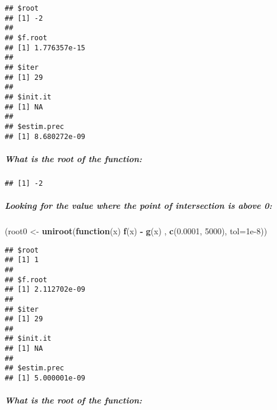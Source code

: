 \documentclass[]{article}
\newenvironment{Shaded}{\begin{snugshade}}{\end{snugshade}}
\newcommand{\ControlFlowTok}[1]{\textcolor[rgb]{0.13,0.29,0.53}{\textbf{#1}}}
\newcommand{\DataTypeTok}[1]{\textcolor[rgb]{0.13,0.29,0.53}{#1}}
\newcommand{\DecValTok}[1]{\textcolor[rgb]{0.00,0.00,0.81}{#1}}
\newcommand{\FloatTok}[1]{\textcolor[rgb]{0.00,0.00,0.81}{#1}}
\newcommand{\KeywordTok}[1]{\textcolor[rgb]{0.13,0.29,0.53}{\textbf{#1}}}
\newcommand{\NormalTok}[1]{#1}
\newcommand{\OperatorTok}[1]{\textcolor[rgb]{0.81,0.36,0.00}{\textbf{#1}}}
\newcommand{\StringTok}[1]{\textcolor[rgb]{0.31,0.60,0.02}{#1}}
\let\oldsubparagraph\subparagraph
\renewcommand{\subparagraph}[1]{\oldsubparagraph{#1}\mbox{}}
\begin{document}
\begin{verbatim}
## $root
## [1] -2
## 
## $f.root
## [1] 1.776357e-15
## 
## $iter
## [1] 29
## 
## $init.it
## [1] NA
## 
## $estim.prec
## [1] 8.680272e-09
\end{verbatim}

\hypertarget{what-is-the-root-of-the-function}{%
\subparagraph{What is the root of the
function:}\label{what-is-the-root-of-the-function}}

\begin{Shaded}
\end{Shaded}

\begin{verbatim}
## [1] -2
\end{verbatim}

\hypertarget{looking-for-the-value-where-the-point-of-intersection-is-above-0}{%
\subparagraph{Looking for the value where the point of intersection is
above
0:}\label{looking-for-the-value-where-the-point-of-intersection-is-above-0}}

\begin{Shaded}
\begin{Highlighting}[]
\NormalTok{(root0 <-}\StringTok{ }\KeywordTok{uniroot}\NormalTok{(}\ControlFlowTok{function}\NormalTok{(x)  }\KeywordTok{f}\NormalTok{(x) }\OperatorTok{-}\StringTok{ }\KeywordTok{g}\NormalTok{(x)  , }\KeywordTok{c}\NormalTok{(}\FloatTok{0.0001}\NormalTok{, }\DecValTok{5000}\NormalTok{), }\DataTypeTok{tol=}\FloatTok{1e-8}\NormalTok{))}
\end{Highlighting}
\end{Shaded}

\begin{verbatim}
## $root
## [1] 1
## 
## $f.root
## [1] 2.112702e-09
## 
## $iter
## [1] 29
## 
## $init.it
## [1] NA
## 
## $estim.prec
## [1] 5.000001e-09
\end{verbatim}

\hypertarget{what-is-the-root-of-the-function-1}{%
\subparagraph{What is the root of the
function:}\label{what-is-the-root-of-the-function-1}}

\begin{Shaded}
\end{Shaded}
\end{document}

